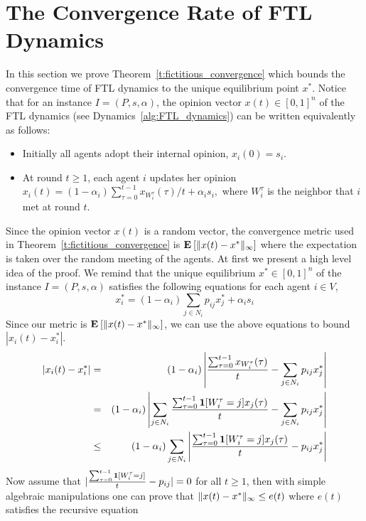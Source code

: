 \section{The Convergence Rate of FTL Dynamics}\label{s:fictitious_convergence}
In this section we prove Theorem~\ref{t:fictitious_convergence} which bounds
the convergence time of FTL dynamics to the unique equilibrium point $x^*$.
Notice that for an instance $I=(P,s,\alpha)$, the opinion vector $x(t) \in [0,1]^n$
of the FTL dynamics (see Dynamics~\ref{alg:FTL_dynamics}) can be written
equivalently as follows:
\begin{itemize}
 \item Initially all agents adopt their internal opinion, $x_i(0)=s_i$.
 \item At round $t \geq 1$, each agent $i$ updates her opinion
 \(
x_i(t)=(1-\alpha_i)\sum_{\tau=0}^{t-1} x_{W_i^\tau}(\tau)/t+ \alpha_i s_i,
\)
where $W_i^\tau$ is the neighbor that $i$ met at round $t$.
\end{itemize}
Since the opinion vector $x(t)$ is a random vector,
the convergence metric used in Theorem~\ref{t:fictitious_convergence} is
$\bm{\mathrm{E}}_{} \left[ \| x(t) - x^* \|_{\infty} \right]$ where the expectation is taken
over the random meeting of the agents.
%
%
At first we present a high level idea of the proof.
We remind that the unique equilibrium $x^* \in [0,1]^n$ of the
instance $I=(P,s,\alpha)$ satisfies the following equations
for each agent $i \in V$,
\[x_i^*= (1-\alpha_i)\sum_{j \in N_i}p_{ij}x_j^* + \alpha_is_i\]
Since our metric is $\bm{\mathrm{E}}_{} \left[ \| x(t)-x^* \|_{\infty} \right]$, we
can use the above equations to bound $|x_i(t)-x_i^*|$.
\begin{eqnarray*}
 |x_i(t)-x_i^*|
 &=& (1-\alpha_i)\left|\frac{\sum_{\tau=0}^{t-1} x_{W_i^\tau}(\tau)}{t}
 - \sum_{j \in N_i} p_{ij}x_j^*\right|\\
 &=& (1-\alpha_i)\left|\sum_{j \in N_i}\frac{\sum_{\tau=0}^{t-1} \bm{1}{\left[W_i^\tau=j\right]}x_j(\tau)}{t}-\sum_{j \in N_i} p_{ij}x_j^*\right|\\
 &\leq& (1-\alpha_i)\sum_{j \in N_i}\left|\frac{\sum_{\tau=0}^{t-1} \bm{1}{\left[W_i^\tau=j\right]}x_j(\tau)}{t}- p_{ij}x_j^*\right|
\end{eqnarray*}
Now assume that $|\frac{\sum_{\tau=0}^{t-1} \bm{1}{\left[W_i^{\tau}=j\right]}}{t}- p_{ij}| = 0$
for all $t\geq 1$, then with simple algebraic manipulations
one can prove that $\| x(t)-x^* \|_{\infty} \leq e(t)$ where $e(t)$
satisfies the recursive equation
